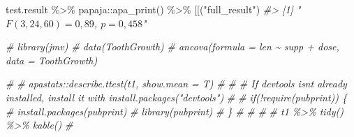 \documentclass[
]{book}
\newenvironment{Shaded}{\begin{snugshade}}{\end{snugshade}}
\newcommand{\AttributeTok}[1]{\textcolor[rgb]{0.77,0.63,0.00}{#1}}
\newcommand{\CommentTok}[1]{\textcolor[rgb]{0.56,0.35,0.01}{\textit{#1}}}
\newcommand{\FunctionTok}[1]{\textcolor[rgb]{0.00,0.00,0.00}{#1}}
\newcommand{\NormalTok}[1]{#1}
\newcommand{\SpecialCharTok}[1]{\textcolor[rgb]{0.00,0.00,0.00}{#1}}
\newcommand{\StringTok}[1]{\textcolor[rgb]{0.31,0.60,0.02}{#1}}
\begin{document}
\begin{Shaded}
\begin{Highlighting}[]
\NormalTok{test.result }\SpecialCharTok{\%\textgreater{}\%}\NormalTok{ papaja}\SpecialCharTok{::}\FunctionTok{apa\_print}\NormalTok{() }\SpecialCharTok{\%\textgreater{}\%} \StringTok{\textasciigrave{}}\AttributeTok{[[}\StringTok{\textasciigrave{}}\NormalTok{(}\StringTok{"full\_result"}\NormalTok{)}
\CommentTok{\#\textgreater{} [1] "$F(3, 24,60) = 0,89$, $p = 0,458$"}

\CommentTok{\# library(jmv)}
\CommentTok{\# data(\textquotesingle{}ToothGrowth\textquotesingle{})}
\CommentTok{\# ancova(formula = len \textasciitilde{} supp + dose, data = ToothGrowth)}

\CommentTok{\# }
\CommentTok{\# apastats::describe.ttest(t1, show.mean = T)}
\CommentTok{\# }
\CommentTok{\# \# If devtools isn\textquotesingle{}t already installed, install it with install.packages("devtools")}
\CommentTok{\# }
\CommentTok{\# if(!require(\textquotesingle{}pubprint\textquotesingle{})) \{}
\CommentTok{\#   install.packages(\textquotesingle{}pubprint\textquotesingle{})}
\CommentTok{\#   library(\textquotesingle{}pubprint\textquotesingle{})}
\CommentTok{\# \}}
\CommentTok{\# }
\CommentTok{\# }
\CommentTok{\# }
\CommentTok{\# t1 \%\textgreater{}\% tidy() \%\textgreater{}\% kable()}
\CommentTok{\# }
\end{Highlighting}
\end{Shaded}


  
\end{document}
